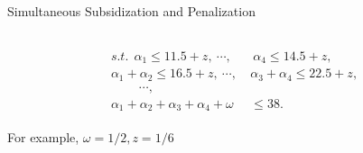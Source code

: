 \documentclass[14pt]{beamer}
\begin{document}
\begin{frame}{Simultaneous Subsidization and Penalization }
\begin{columns}
\begin{column}{7cm}
\begin{shaded}
\vspace{-1.5em}
\begin{eqnarray*}
\begin{aligned}
s.t.~~ \alpha_1 \leq 11.5+z,~\cdots,&~\alpha_4 \leq 14.5+z,\\
\alpha_1 + \alpha_2 \leq 16.5+z,~\cdots,~ &\alpha_3+\alpha_4 \leq 22.5+z,\\
~~~~~~~~~~\cdots,~~&\\
\alpha_1 + \alpha_2 + \alpha_3 + \alpha_4 +\omega &\leq 38.
\end{aligned}
\end{eqnarray*}
\vspace{-1.5em}
\end{shaded}

\centering

For example, $\omega= 1/2, z=1/6$

\end{column}
\end{columns}
\end{frame}
\end{document}
